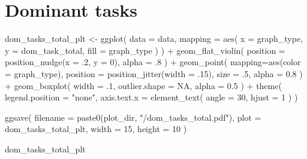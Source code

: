 \documentclass[
]{book}
\newenvironment{Shaded}{\begin{snugshade}}{\end{snugshade}}
\newcommand{\AttributeTok}[1]{\textcolor[rgb]{0.77,0.63,0.00}{#1}}
\newcommand{\ConstantTok}[1]{\textcolor[rgb]{0.00,0.00,0.00}{#1}}
\newcommand{\DecValTok}[1]{\textcolor[rgb]{0.00,0.00,0.81}{#1}}
\newcommand{\FloatTok}[1]{\textcolor[rgb]{0.00,0.00,0.81}{#1}}
\newcommand{\FunctionTok}[1]{\textcolor[rgb]{0.00,0.00,0.00}{#1}}
\newcommand{\NormalTok}[1]{#1}
\newcommand{\OtherTok}[1]{\textcolor[rgb]{0.56,0.35,0.01}{#1}}
\newcommand{\SpecialCharTok}[1]{\textcolor[rgb]{0.00,0.00,0.00}{#1}}
\newcommand{\StringTok}[1]{\textcolor[rgb]{0.31,0.60,0.02}{#1}}
\begin{document}
\hypertarget{dominant-tasks}{%
\section{Dominant tasks}\label{dominant-tasks}}

\begin{Shaded}
\begin{Highlighting}[]
\NormalTok{dom\_tasks\_total\_plt }\OtherTok{\textless{}{-}} \FunctionTok{ggplot}\NormalTok{(}
  \AttributeTok{data =}\NormalTok{ data,}
  \AttributeTok{mapping =} \FunctionTok{aes}\NormalTok{(}
    \AttributeTok{x =}\NormalTok{ graph\_type,}
    \AttributeTok{y =}\NormalTok{ dom\_task\_total,}
    \AttributeTok{fill =}\NormalTok{ graph\_type}
\NormalTok{  )}
\NormalTok{) }\SpecialCharTok{+}
  \FunctionTok{geom\_flat\_violin}\NormalTok{(}
    \AttributeTok{position =} \FunctionTok{position\_nudge}\NormalTok{(}\AttributeTok{x =}\NormalTok{ .}\DecValTok{2}\NormalTok{, }\AttributeTok{y =} \DecValTok{0}\NormalTok{),}
    \AttributeTok{alpha =}\NormalTok{ .}\DecValTok{8}
\NormalTok{  ) }\SpecialCharTok{+}
  \FunctionTok{geom\_point}\NormalTok{(}
    \AttributeTok{mapping=}\FunctionTok{aes}\NormalTok{(}\AttributeTok{color =}\NormalTok{ graph\_type),}
    \AttributeTok{position =} \FunctionTok{position\_jitter}\NormalTok{(}\AttributeTok{width =}\NormalTok{ .}\DecValTok{15}\NormalTok{),}
    \AttributeTok{size =}\NormalTok{ .}\DecValTok{5}\NormalTok{,}
    \AttributeTok{alpha =} \FloatTok{0.8}
\NormalTok{  ) }\SpecialCharTok{+}
  \FunctionTok{geom\_boxplot}\NormalTok{(}
    \AttributeTok{width =}\NormalTok{ .}\DecValTok{1}\NormalTok{,}
    \AttributeTok{outlier.shape =} \ConstantTok{NA}\NormalTok{,}
    \AttributeTok{alpha =} \FloatTok{0.5}
\NormalTok{  ) }\SpecialCharTok{+}
  \FunctionTok{theme}\NormalTok{(}
    \AttributeTok{legend.position =} \StringTok{"none"}\NormalTok{,}
    \AttributeTok{axis.text.x =} \FunctionTok{element\_text}\NormalTok{(}
      \AttributeTok{angle =} \DecValTok{30}\NormalTok{,}
      \AttributeTok{hjust =} \DecValTok{1}
\NormalTok{    )}
\NormalTok{  )}

\FunctionTok{ggsave}\NormalTok{(}
  \AttributeTok{filename =} \FunctionTok{paste0}\NormalTok{(plot\_dir, }\StringTok{"/dom\_tasks\_total.pdf"}\NormalTok{),}
  \AttributeTok{plot =}\NormalTok{ dom\_tasks\_total\_plt,}
  \AttributeTok{width =} \DecValTok{15}\NormalTok{,}
  \AttributeTok{height =} \DecValTok{10}
\NormalTok{)}

\NormalTok{dom\_tasks\_total\_plt}
\end{Highlighting}
\end{Shaded}
\end{document}
